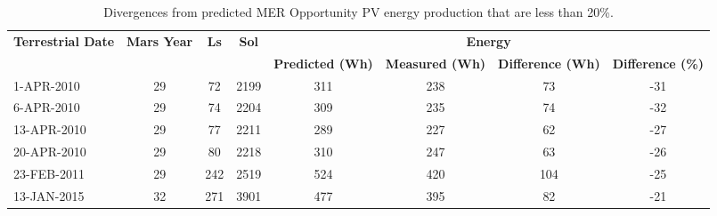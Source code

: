 \begin{table}[H]
    \centering
    \caption{Divergences from predicted MER Opportunity PV energy production that are less than 20\%.}
    \label{tab:divergences-less-than-m20pc}
    \begin{tabular}{|l|c|c|c|c|c|c|c|}
    \hline
    \multicolumn{1}{|c|}{\multirow{2}{*}{\textbf{Terrestrial Date}}} & \multirow{2}{*}{\textbf{Mars Year}} & \multirow{2}{*}{\textbf{Ls}} & \multirow{2}{*}{\textbf{Sol}} & \multicolumn{4}{c|}{\textbf{Energy}} \\ \cline{5-8}
    \multicolumn{1}{|c|}{} &  &  &  & \textbf{Predicted (Wh)} & \textbf{Measured (Wh)} & \textbf{Difference (Wh)} & \textbf{Difference (\%)} \\ \hline
    1-APR-2010 & 29 & 72 & 2199 & 311 & 238 & 73 & -31 \\
    6-APR-2010 & 29 & 74 & 2204 & 309 & 235 & 74 & -32 \\
    13-APR-2010 & 29 & 77 & 2211 & 289 & 227 & 62 & -27 \\
    20-APR-2010 & 29 & 80 & 2218 & 310 & 247 & 63 & -26 \\ \hline
    23-FEB-2011 & 29 & 242 & 2519 & 524 & 420 & 104 & -25 \\ \hline
    13-JAN-2015 & 32 & 271 & 3901 & 477 & 395 & 82 & -21 \\ \hline
    \end{tabular}
\end{table}
